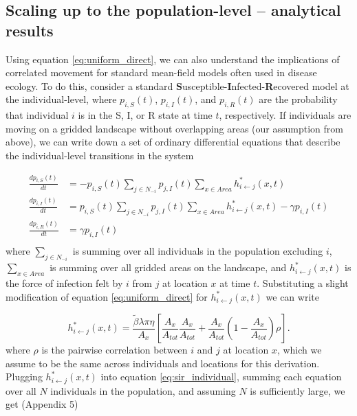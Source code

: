 \documentclass[letterpaper]{article}
\begin{document}
\subsection*{Scaling up to the population-level -- analytical results}

Using equation \ref{eq:uniform_direct}, we can also understand the implications of correlated movement for standard mean-field models often used in disease ecology. To do this, consider a standard \textbf{S}usceptible-\textbf{I}nfected-\textbf{R}ecovered model at the individual-level, where $p_{i, S}(t)$, $p_{i, I}(t)$, and $p_{i, R}(t)$ are the probability that individual $i$ is in the S, I, or R state at time $t$, respectively.  If individuals are moving on a gridded landscape without overlapping areas (our assumption from above), we can write down a set of ordinary differential equations that describe the individual-level transitions in the system

\begin{equation}
    \begin{aligned}
        \frac{d p_{i, S}(t)}{dt} &= -p_{i, S}(t) \sum_{j \in N_{-i}} p_{j, I}(t)  \sum_{x \in Area} h_{i \leftarrow j}^*(x, t) \\
        \frac{d p_{i, I}(t)}{dt} &= p_{i, S}(t) \sum_{j \in N_{-i}} p_{j, I}(t)  \sum_{x \in Area} h_{i \leftarrow j}^*(x, t) - \gamma p_{i, I}(t) \\
        \frac{d p_{i, R}(t)}{dt} &= \gamma p_{i, I}(t) \\
    \end{aligned}
    \label{eq:sir_individual}
\end{equation}
where $\sum_{j \in N_{-i}}$ is summing over all individuals in the population excluding $i$, $\sum_{x \in Area}$ is summing over all gridded areas on the landscape, and $h^*_{i \leftarrow j}(x, t)$ is the force of infection felt by $i$ from $j$ at location $x$ at time $t$. Substituting a slight modification of equation \ref{eq:uniform_direct} for $h^*_{i \leftarrow j}(x, t)$ we can write 

$$
h^*_{i \leftarrow j}(x, t) = \frac{\tilde{\beta} \lambda \pi \eta}{A_x} \left[\frac{A_x}{A_{tot}}\frac{A_x}{A_{tot}} + \frac{A_x}{A_{tot}}(1 - \frac{A_x}{A_{tot}}) \rho \right].
$$
where $\rho$ is the pairwise correlation between $i$ and $j$ at location $x$, which we assume to be the same across individuals and locations for this derivation. Plugging $h^*_{i \leftarrow j}(x, t)$ into equation \ref{eq:sir_individual}, summing each equation over all $N$ individuals in the population, and assuming $N$ is sufficiently large, we get (Appendix 5)
\end{document}
